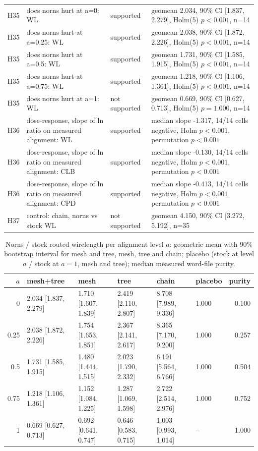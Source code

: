 \begin{table}[t]
\begin{tabular}{@{}lp{5.2cm}p{2.4cm}p{8.4cm}@{}}
H35 & does norns hurt at a=0: WL & supported & geomean 2.034, 90\% CI [1.837, 2.279], Holm(5) $p<0.001$, n=14 \\
H35 & does norns hurt at a=0.25: WL & supported & geomean 2.038, 90\% CI [1.872, 2.226], Holm(5) $p<0.001$, n=14 \\
H35 & does norns hurt at a=0.5: WL & supported & geomean 1.731, 90\% CI [1.585, 1.915], Holm(5) $p<0.001$, n=14 \\
H35 & does norns hurt at a=0.75: WL & supported & geomean 1.218, 90\% CI [1.106, 1.361], Holm(5) $p<0.001$, n=14 \\
H35 & does norns hurt at a=1: WL & not supported & geomean 0.669, 90\% CI [0.627, 0.713], Holm(5) $p=1.000$, n=14 \\
H36 & dose-response, slope of ln ratio on measured alignment: WL & supported & median slope -1.317, 14/14 cells negative, Holm $p<0.001$, permutation $p<0.001$ \\
H36 & dose-response, slope of ln ratio on measured alignment: CLB & supported & median slope -0.130, 14/14 cells negative, Holm $p<0.001$, permutation $p<0.001$ \\
H36 & dose-response, slope of ln ratio on measured alignment: CPD & supported & median slope -0.413, 14/14 cells negative, Holm $p<0.001$, permutation $p<0.001$ \\
H37 & control: chain, norns vs stock WL & not supported & geomean 4.150, 90\% CI [3.272, 5.192], n=35 \\
\bottomrule
\end{tabular}
\end{table}
\begin{table}[t]
\caption{Norns / stock routed wirelength per alignment level $a$: geometric mean with 90\% bootstrap interval for mesh and tree, mesh, tree and chain; placebo (stock at level $a$ / stock at $a=1$, mesh and tree); median measured word-file purity.}
\label{tab:r6level}
\centering\scriptsize
\begin{tabular}{@{}rlllllr@{}}
\toprule
$a$ & mesh+tree & mesh & tree & chain & placebo & purity \\
\midrule
0 & 2.034 [1.837, 2.279] & 1.710 [1.607, 1.839] & 2.419 [2.110, 2.807] & 8.708 [7.989, 9.336] & 1.000 & 0.100 \\
0.25 & 2.038 [1.872, 2.226] & 1.754 [1.653, 1.851] & 2.367 [2.141, 2.617] & 8.365 [7.170, 9.200] & 1.000 & 0.257 \\
0.5 & 1.731 [1.585, 1.915] & 1.480 [1.444, 1.515] & 2.023 [1.790, 2.332] & 6.191 [5.564, 6.766] & 1.000 & 0.504 \\
0.75 & 1.218 [1.106, 1.361] & 1.152 [1.084, 1.225] & 1.287 [1.069, 1.598] & 2.722 [2.514, 2.976] & 1.000 & 0.752 \\
1 & 0.669 [0.627, 0.713] & 0.692 [0.641, 0.747] & 0.646 [0.583, 0.715] & 1.003 [0.993, 1.014] & -- & 1.000 \\
\bottomrule
\end{tabular}
\end{table}
